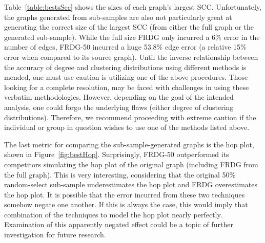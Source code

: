 \documentclass[pdftex,11pt,a4paper,twocolumn]{scrartcl}
\begin{document}
Table~\ref{table:bestsScc} shows the sizes of each graph's largest SCC. Unfortunately, the graphs generated from sub-samples are also not particularly great at generating the correct size of the largest SCC (from either the full graph or the generated sub-sample). While the full size FRDG only incurred a 6\% error in the number of edges, FRDG-50 incurred a huge 53.8\% edge error (a relative 15\% error when compared to its source graph). Until the inverse relationship between the accuracy of degree and clustering distributions using different methods is mended, one must use caution is utilizing one of the above procedures. Those looking for a complete resolution, may be faced with challenges in using these verbatim methodologies. However, depending on the goal of the intended analysis, one could forgo the underlying flaws (either degree of clustering distributions). Therefore, we recommend proceeding with extreme caution if the individual or group in question wishes to use one of the methods listed above.

\begin{table}[h]
\centering
{}
\caption{Largest SCCs of Generated-from-Sub-Sample Graphs}
\label{table:bestsScc}
\end{table}

The last metric for comparing the sub-sample-generated graphs is the hop plot, shown in Figure~\ref{fig:bestHop}. Surprisingly, FRDG-50 outperformed its competitors simulating the hop plot of the original graph (including FRDG from the full graph). This is very interesting, considering that the original 50\% random-select sub-sample underestimates the hop plot and FRDG overestimates the hop plot. It is possible that the error incurred from these two techniques somehow negate one another. If this is always the case, this would imply that combination of the techniques to model the hop plot nearly perfectly. Examination of this apparently negated effect could be a topic of further investigation for future research.
\end{document}

